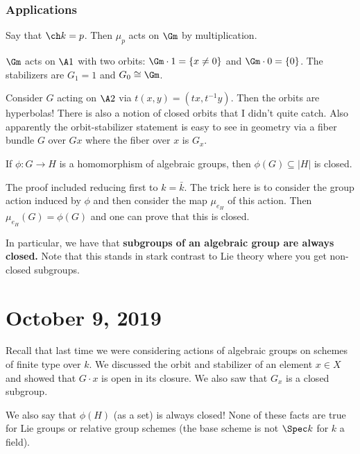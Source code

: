 \documentclass[12pt]{article}
\begin{document}
\subsubsection{Applications}
Say that $\ch k=p$. Then $\mu_p$ acts on $\Gm$ by multiplication.

\brk 

$\Gm$ acts on $\A1$ with two orbits: $\Gm\cdot 1=\{x\ne 0\}$ and $\Gm\cdot 0=\{0\}$. The stabilizers are 
$G_1=1$ and $G_0\cong\Gm$.

\brk

Consider $G$ acting on $\A2$ via $t(x,y)=(tx,t^{-1}y)$. Then the orbits are hyperbolas! There is also a notion of closed 
orbits that I didn't quite catch. Also apparently the orbit-stabilizer statement is easy to see in geometry via 
a fiber bundle $G$ over $Gx$ where the fiber over $x$ is $G_x$.

\begin{prop}
	If $\phi:G\to H$ is a homomorphism of algebraic groups, then $\phi(G)\subseteq |H|$ is closed.
\end{prop}
\begin{rmk}
	The proof included reducing first to $k=\bar k$. The trick here is to consider the group action induced by $\phi$
	and then consider the map $\mu_{e_H}$ of this action. Then $\mu_{e_H}(G)=\phi(G)$ and one can prove that this is closed.
\end{rmk}

In particular, we have that \textbf{subgroups of an algebraic group are always closed.} Note that this stands in stark contrast 
to Lie theory where you get non-closed subgroups.

\section{October 9, 2019}
Recall that last time we were considering actions of algebraic groups on schemes of finite type over $k$. We discussed the orbit and stabilizer 
of an element $x\in X$ and showed that $G\cdot x$ is open in its closure. We also saw that $G_x$ is a closed subgroup.

We also say that $\phi(H)$ (as a set) is always closed! None of these facts are true for Lie groups or relative group schemes 
(the base scheme is not $\Spec k$ for $k$ a field).
\end{document}
